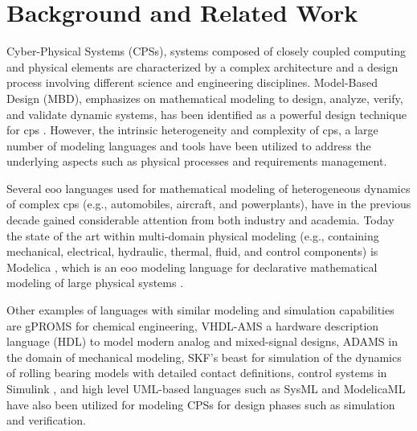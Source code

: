 

\chapter{Background and Related Work}
\label{cha:background}

Cyber-Physical Systems (CPSs), systems composed of closely coupled computing and physical elements are characterized by a complex architecture and a design process involving different science and engineering disciplines. Model-Based Design (MBD), emphasizes on mathematical modeling to design, analyze, verify, and validate dynamic systems,  has been identified as a powerful design technique for \acrshort{cps} \cite{mbsdbalasubramanian,mbsdbrooks,mbsdkarasi}. However, the intrinsic heterogeneity and complexity of \acrshort{cps}, a large number of modeling languages and tools have been utilized to address the underlying aspects such as physical processes and requirements management.

Several \acrshort{eoo} languages used for mathematical modeling of heterogeneous dynamics of complex \acrshort{cps} (e.g., automobiles, aircraft, and powerplants), have in the previous decade gained considerable attention from both industry and academia. Today the state of the art within multi-domain physical modeling (e.g., containing mechanical, electrical, hydraulic, thermal, fluid, and control components) is Modelica \cite{modelica}, which is an \acrshort{eoo} modeling language for declarative mathematical modeling of large physical systems \cite{modelicahilding,modelicapeter,modelicapeterbook,modelicatiller}. 

Other examples of languages with similar modeling and simulation capabilities are gPROMS \cite{gproms,gpromsbarton,gpromsoh,gpromspaulphd} for chemical engineering, VHDL-AMS \cite{vhdlamsernst,vhdlamsieee} a hardware description language (HDL) to model modern analog and mixed-signal designs, ADAMS \cite{adams} in the domain of mechanical modeling, SKF’s \acrshort{beast} \cite{beast} for simulation of the dynamics of rolling bearing  models with detailed contact definitions, control systems in Simulink \cite{simulink}, and  high level UML-based languages such as SysML \cite{sysml,sysmlmorgan} and ModelicaML \cite{modelicaml,modelicamlreport,modelicamlverification,modelicamlwladimir} have also been utilized for modeling CPSs  for design phases such as simulation and verification.

